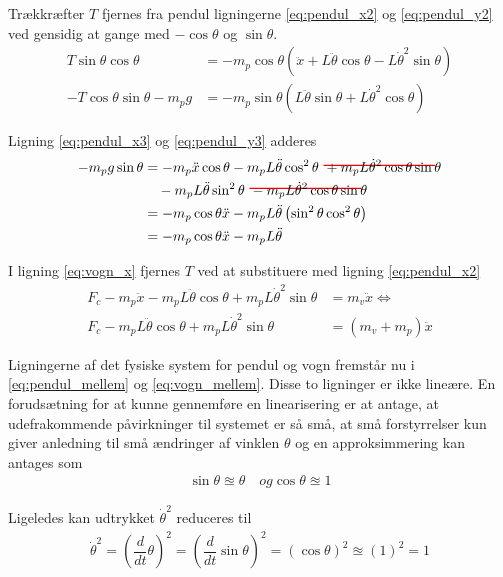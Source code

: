Trækkræfter $T$ fjernes fra pendul ligningerne \ref{eq:pendul_x2} og \ref{eq:pendul_y2} ved gensidig at gange med $-\cos{\theta}$ og $\sin{\theta}$. 
\begin{align}
T\sin{\theta}\cos{\theta} &=   -m_p \cos{\theta} \left( \ddot{x} + L\ddot{\theta}\cos{\theta} - L\dot{\theta}^2\sin{\theta} \right) \label{eq:pendul_x3} \\
-T\cos{\theta}\sin{\theta} - m_p g &=  -m_p \sin{\theta} \left( L\ddot{\theta}\sin{\theta} + L\dot{\theta}^2\cos{\theta}\right) \label{eq:pendul_y3}
\end{align}

Ligning \ref{eq:pendul_x3} og \ref{eq:pendul_y3} adderes
\begin{align}
-m_p g \sin{\theta}    &= - m_p \ddot{x}\cos{\theta}
						- m_p L\ddot{\theta}\cos^2\theta\
						\hcancel[red]{+ m_p L \dot{\theta}^2\cos{\theta}\sin{\theta}}\\
					   &\quad - m_p L\ddot{\theta}\sin^2\theta\
					    \hcancel[red]{- m_p L \dot{\theta}^2\cos{\theta}\sin{\theta}} \\
					   &=- m_p \cos{\theta}\ddot{x} - m_p L \ddot{\theta} \left(\sin^2 \theta \cos^2 \theta \right) \\
					   &=- m_p \cos{\theta}\ddot{x} - m_p L \ddot{\theta} \label{eq:pendul_mellem}
\end{align}

I ligning \ref{eq:vogn_x} fjernes $T$ ved at substituere med ligning \ref{eq:pendul_x2}
\begin{align}
F_c - m_p \ddot{x} - m_p L\ddot{\theta}\cos{\theta} + m_p L\dot{\theta}^2\sin{\theta} &= m_v \ddot{x} \Leftrightarrow \\
F_c - m_p L\ddot{\theta}\cos{\theta} + m_p L\dot{\theta}^2\sin{\theta} &= (m_v + m_p)  \ddot{x} \label{eq:vogn_mellem}
\end{align}

Ligningerne af det fysiske system for pendul og vogn fremstår nu i \ref{eq:pendul_mellem} og \ref{eq:vogn_mellem}. Disse to ligninger er ikke lineære. En forudsætning for at kunne gennemføre en linearisering er at antage, at udefrakommende påvirkninger til systemet er så små, at små forstyrrelser kun giver anledning til små ændringer af vinklen $\theta$ og en approksimmering kan antages som
\begin{align}
\sin{\theta} \approxeq \theta \quad og \cos{\theta} \approxeq 1
\end{align} 

Ligeledes kan udtrykket $\dot{\theta}^2$ reduceres til
\begin{align}
\dot{\theta}^2 = \left( \dfrac{d}{dt}\theta \right)^2 =  \left( \dfrac{d}{dt}\sin{\theta} \right)^2 = \left(\cos{\theta}\right)^2 \approxeq (1)^2 = 1
\end{align}

